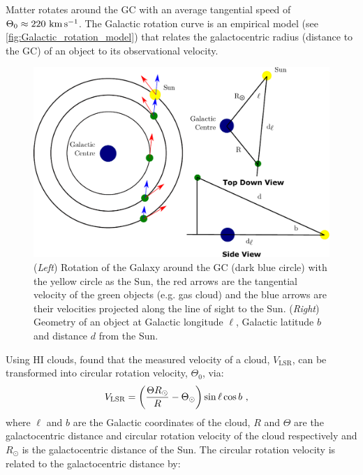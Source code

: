 Matter rotates around the GC with an average tangential speed of $\Theta_0\approx 220~\si{\kilo\meter\per\second}$. The Galactic rotation curve is an empirical model (see \autoref{fig:Galactic_rotation_model}) that relates the galactocentric radius (distance to the GC) of an object to its observational velocity.
\begin{figure}[h!]
	\centering
	\includegraphics[width=1.0\textwidth]{06_Interstellar_Medium/Images/Theory/galaxy_combined.pdf}
	\caption{(\textit{Left}) Rotation of the Galaxy around the GC (dark blue circle) with the yellow circle as the Sun, the red arrows are the tangential velocity of the green objects (e.g. gas cloud) and the blue arrows are their velocities projected along the line of sight to the Sun. (\textit{Right}) Geometry of an object at Galactic longitude $\ell$, Galactic latitude $b$ and distance $d$ from the Sun.}
	\label{fig:Galactic_rotation_model}
\end{figure}
Using HI clouds, \cite{1993A&A...275...67B} found that the measured velocity of a cloud, $V_\text{LSR}$, can be transformed into circular rotation velocity, $\Theta_0$, via:
\begin{equation}
\begin{aligned}
    V_\text{LSR}&=\qty(\frac{\Theta R_\odot}{R}-\Theta_\odot)\sin\ell \cos b\text{ ,}
\end{aligned} \label{eq:chapter_6_brand_blitz_velocity}
\end{equation}
\noindent where $\ell$ and $b$ are the Galactic coordinates of the cloud, $R$ and $\Theta$ are the galactocentric distance and circular rotation velocity of the cloud respectively and $R_\odot$ is the galactocentric distance of the Sun. The circular rotation velocity is related to the galactocentric distance by:


